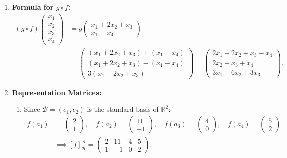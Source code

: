 \begin{exercisesolution}
\begin{enumerate}[label=\textbf{(\alph*)}]
    \item \textbf{Formula for $g \circ f$:}
    \begin{align*}
    (g \circ f)\begin{pmatrix} x_1 \\ x_2 \\ x_3 \\ x_4 \end{pmatrix}
    &= g\begin{pmatrix} x_1 + 2x_2 + x_3 \\ x_1 - x_4 \end{pmatrix} \\
    &= \begin{pmatrix} (x_1 + 2x_2 + x_3) + (x_1 - x_4) \\ (x_1 + 2x_2 + x_3) - (x_1 - x_4) \\ 3(x_1 + 2x_2 + x_3) \end{pmatrix}
    = \begin{pmatrix} 2x_1 + 2x_2 + x_3 - x_4 \\ 2x_2 + x_3 + x_4 \\ 3x_1 + 6x_2 + 3x_3 \end{pmatrix}.
    \end{align*}

    \item \textbf{Representation Matrices:}
    \begin{enumerate}[label=\textbf{(\roman*)}]
        \item Since $\mathcal{B} = (e_1, e_2)$ is the standard basis of $\mathbb{R}^2$:
        \begin{align*}
        f(a_1) &= \begin{pmatrix} 2 \\ 1 \end{pmatrix}, \quad f(a_2) = \begin{pmatrix} 11 \\ -1 \end{pmatrix}, \quad f(a_3) = \begin{pmatrix} 4 \\ 0 \end{pmatrix}, \quad f(a_4) = \begin{pmatrix} 5 \\ 2 \end{pmatrix} \\
        &\implies [f]_{\mathcal{B}}^{\mathcal{A}} = \begin{pmatrix} 2 & 11 & 4 & 5 \\ 1 & -1 & 0 & 2 \end{pmatrix}.
        \end{align*}


\end{enumerate}
\end{enumerate}
\end{exercisesolution}
